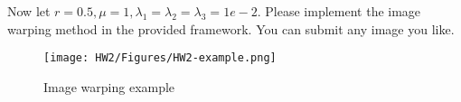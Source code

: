 \documentclass[11pt,letter,notitlepage]{article}
\begin{document}
\begin{exercise}
\begin{enumerate}
    

    Now let $r=0.5, \mu=1, \lambda
    _1 = \lambda_2 = \lambda_3 = 1e-2$. Please implement the image warping method in the provided framework. You can submit any image you like.
\end{enumerate}
\end{exercise}
\begin{figure}[htbp]
    \centering
        \texttt{[image: HW2/Figures/HW2-example.png]}
        \caption{Image warping example}
        \label{fig:image-warping}
\end{figure}
    
\end{document}

